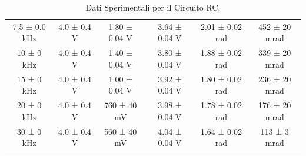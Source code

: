 \documentclass[a4paper]{article}
\begin{document}
\begin{table}[htbp]
\begin{tabular}{|c|c|c|c|c|c|}
    7.5 ± 0.0 kHz & 4.0 ± 0.4 V & 1.80 ± 0.04 V & 3.64 ± 0.04 V & 2.01 ± 0.02 rad & 452 ± 20 mrad \\
    10 ± 0 kHz & 4.0 ± 0.4 V & 1.40 ± 0.04 V & 3.80 ± 0.04 V & 1.88 ± 0.02 rad & 339 ± 20 mrad \\
    15 ± 0 kHz & 4.0 ± 0.4 V & 1.00 ± 0.04 V & 3.92 ± 0.04 V & 1.80 ± 0.02 rad & 236 ± 20 mrad \\
    20 ± 0 kHz & 4.0 ± 0.4 V & 760 ± 40 mV & 3.98 ± 0.04 V & 1.78 ± 0.02 rad & 176 ± 20 mrad \\
    30 ± 0 kHz & 4.0 ± 0.4 V & 560 ± 40 mV & 4.04 ± 0.04 V & 1.64 ± 0.02 rad & 113 ± 3 mrad \\
    \hline
    \end{tabular}
    \caption{Dati Sperimentali per il Circuito RC.}
    \label{tab:dati_sperimentali_rc}
    \end{table}
\end{document}
